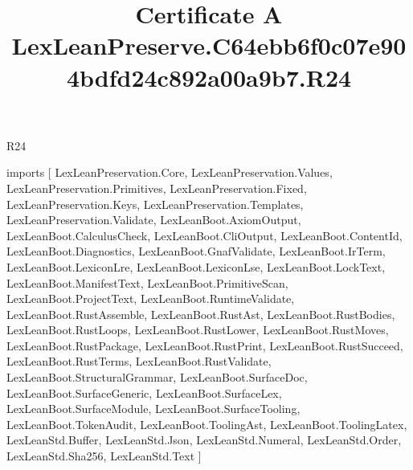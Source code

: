 \begin{lexlean}{R24}
\title{Certificate A LexLeanPreserve.C64ebb6f0c07e904bdfd24c892a00a9b7.R24}
\begin{coremodule}
imports [
  LexLeanPreservation.Core,
  LexLeanPreservation.Values,
  LexLeanPreservation.Primitives,
  LexLeanPreservation.Fixed,
  LexLeanPreservation.Keys,
  LexLeanPreservation.Templates,
  LexLeanPreservation.Validate,
  LexLeanBoot.AxiomOutput,
  LexLeanBoot.CalculusCheck,
  LexLeanBoot.CliOutput,
  LexLeanBoot.ContentId,
  LexLeanBoot.Diagnostics,
  LexLeanBoot.GnafValidate,
  LexLeanBoot.IrTerm,
  LexLeanBoot.LexiconLre,
  LexLeanBoot.LexiconLse,
  LexLeanBoot.LockText,
  LexLeanBoot.ManifestText,
  LexLeanBoot.PrimitiveScan,
  LexLeanBoot.ProjectText,
  LexLeanBoot.RuntimeValidate,
  LexLeanBoot.RustAssemble,
  LexLeanBoot.RustAst,
  LexLeanBoot.RustBodies,
  LexLeanBoot.RustLoops,
  LexLeanBoot.RustLower,
  LexLeanBoot.RustMoves,
  LexLeanBoot.RustPackage,
  LexLeanBoot.RustPrint,
  LexLeanBoot.RustSucceed,
  LexLeanBoot.RustTerms,
  LexLeanBoot.RustValidate,
  LexLeanBoot.StructuralGrammar,
  LexLeanBoot.SurfaceDoc,
  LexLeanBoot.SurfaceGeneric,
  LexLeanBoot.SurfaceLex,
  LexLeanBoot.SurfaceModule,
  LexLeanBoot.SurfaceTooling,
  LexLeanBoot.TokenAudit,
  LexLeanBoot.ToolingAst,
  LexLeanBoot.ToolingLatex,
  LexLeanStd.Buffer,
  LexLeanStd.Json,
  LexLeanStd.Numeral,
  LexLeanStd.Order,
  LexLeanStd.Sha256,
  LexLeanStd.Text
]


\end{coremodule}
\end{lexlean}
